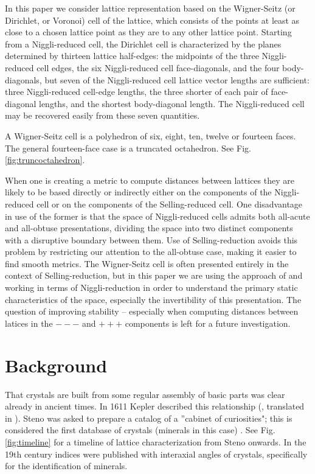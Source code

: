 \documentclass[preprint]{iucr}              %
\begin{document}
In this paper we consider lattice representation based on
the Wigner-Seitz \cite{wigner1933} (or Dirichlet, or Voronoi) cell of the lattice, which consists of the points at least as close to a chosen lattice point as they are to any other lattice point.  
Starting from a Niggli-reduced cell, the Dirichlet cell is
characterized by the planes determined by thirteen lattice half-edges:
the midpoints of the three Niggli-reduced cell edges, the six Niggli-reduced cell face-diagonals, and the four body-diagonals, but seven of the Niggli-reduced cell lattice vector
lengths are sufficient:  three Niggli-reduced cell-edge lengths, the three shorter of each pair of 
face-diagonal lengths, and the shortest body-diagonal length.
The Niggli-reduced cell may be recovered easily from these seven
quantities.

A Wigner-Seitz cell is a polyhedron of six, eight, ten, twelve or fourteen
faces.  The general fourteen-face case is a truncated octahedron.  See
Fig. \ref{fig:truncoctahedron}.

When one is creating a metric to compute distances between lattices they
are likely to be based directly or indirectly either on the components
of the Niggli-reduced cell or on the components of the Selling-reduced
cell.  One disadvantage in use of the former is that the space
of Niggli-reduced cells admits both all-acute and all-obtuse presentations,
dividing the space into two distinct components with a disruptive boundary
between them.  Use of Selling-reduction avoids this problem by restricting
our attention to the all-obtuse case, making it easier to find smooth
metrics.  The Wigner-Seitz cell is often presented entirely in the context
of Selling-reduction, but in this paper we are using the approach of \cite{Hart2019}
and working in terms of Niggli-reduction in order to understand the primary
static characteristics of the space, especially the invertibility of
this presentation.  The question of improving stability -- especially when
computing distances between latices in the $---$ and $+++$ components is left for a future
investigation.


\section{Background}

That crystals are built from some regular assembly of basic parts was clear already in ancient times.    In 1611 Kepler described this relationship (, translated in ). Steno was asked to prepare a catalog of a ''cabinet of curiosities"; this is considered the first database of crystals (minerals in this case) \cite{Steno1669}.  See Fig. \ref{fig:timeline} for a timeline
of lattice characterization from Steno onwards.  In the 19th century 
indices were published with interaxial angles of crystals, specifically 
for the identification of minerals.
\end{document}
